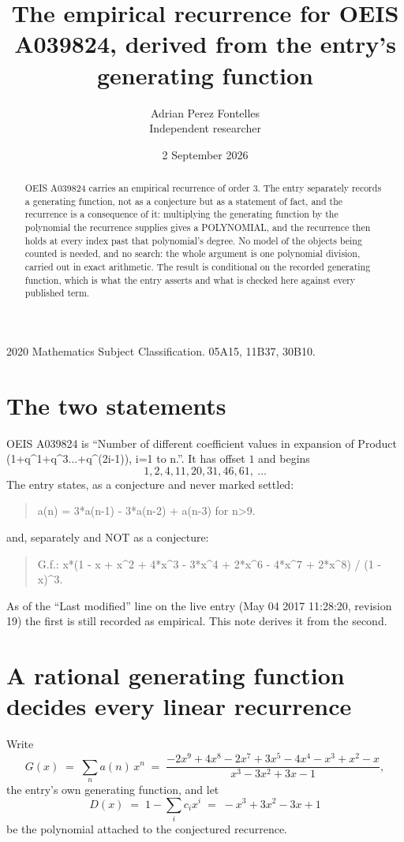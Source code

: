 \documentclass[11pt,a4paper]{article}
\title{The empirical recurrence for OEIS A039824, derived from the entry's generating function}
\author{Adrian Perez Fontelles\\ \small Independent researcher}
\date{2 September 2026}
\theoremstyle{plain}
\theoremstyle{definition}
\begin{document}
\maketitle

\begin{abstract}
OEIS A039824 carries an empirical recurrence of order $3$. The entry separately records a
generating function, not as a conjecture but as a statement of fact, and the recurrence is a
consequence of it: multiplying the generating function by the polynomial the recurrence
supplies gives a POLYNOMIAL, and the recurrence then holds at every index past that
polynomial's degree. No model of the objects being counted is needed, and no search: the
whole argument is one polynomial division, carried out in exact arithmetic. The result is
conditional on the recorded generating function, which is what the entry asserts and what is
checked here against every published term.
\end{abstract}

\noindent\small 2020 Mathematics Subject Classification. 05A15, 11B37, 30B10.\normalsize

\section{The two statements}

OEIS A039824 is ``Number of different coefficient values in expansion of Product (1+q\^{}1+q\^{}3...+q\^{}(2i-1)), i=1 to n.''. It has offset $1$ and begins
\[
1, 2, 4, 11, 20, 31, 46, 61,\ \dots
\]
The entry states, as a conjecture and never marked settled:
\begin{quote}
a(n) = 3*a(n-1) - 3*a(n-2) + a(n-3) for n>9.
\end{quote}
and, separately and NOT as a conjecture:
\begin{quote}
G.f.: x*(1 - x + x\^{}2 + 4*x\^{}3 - 3*x\^{}4 + 2*x\^{}6 - 4*x\^{}7 + 2*x\^{}8) / (1 - x)\^{}3.
\end{quote}
As of the ``Last modified'' line on the live entry (May 04 2017 11:28:20, revision 19) the first is still
recorded as empirical. This note derives it from the second.

\section{A rational generating function decides every linear recurrence}

Write
\[
G(x)\;=\;\sum_{n}a(n)\,x^{n}\;=\;\frac{- 2 x^{9} + 4 x^{8} - 2 x^{7} + 3 x^{5} - 4 x^{4} - x^{3} + x^{2} - x}{x^{3} - 3 x^{2} + 3 x - 1},
\]
the entry's own generating function, and let
\[
D(x)\;=\;1-\sum_i c_i x^{i}\;=\;- x^{3} + 3 x^{2} - 3 x + 1
\]
be the polynomial attached to the conjectured recurrence.
\end{document}
